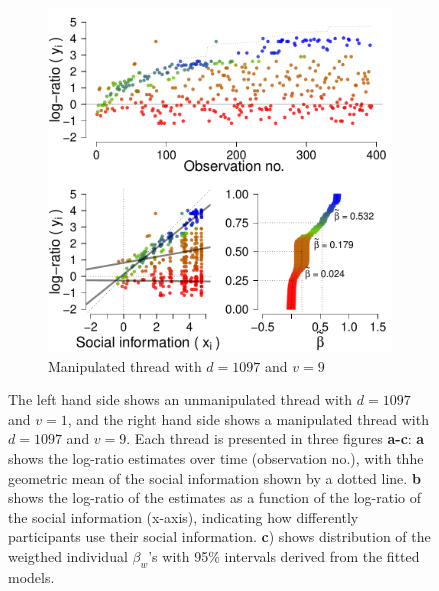 \documentclass[9pt,twocolumn,twoside,lineno]{pnas-new}
\begin{document}
\begin{figure}[!ht]
\begin{subfigure}[t]{.48\linewidth}
		\includegraphics[width=1\linewidth]{../plots/m10979.pdf}
		\caption{Manipulated thread with $d=1097$ and $v=9$}
		\label{fig: thread m 1097 9}
	\end{subfigure}
	\caption{The left hand side shows an unmanipulated thread with $d=1097$ and $v=1$, and the right hand side shows a manipulated thread with $d=1097$ and $v=9$. Each thread is presented in three figures \textbf{a-c}: \textbf{a} shows the log-ratio estimates over time (observation no.), with thhe geometric mean of the social information shown by a dotted line. \textbf{b} shows the log-ratio of the estimates as a function of the log-ratio of the social information (x-axis), indicating how differently participants use their social information. \textbf{c}) shows distribution of the weigthed individual $\beta_w$'s with 95\% intervals derived from the fitted models.}
	\label{fig: social influence}
\end{figure}


\end{document}
